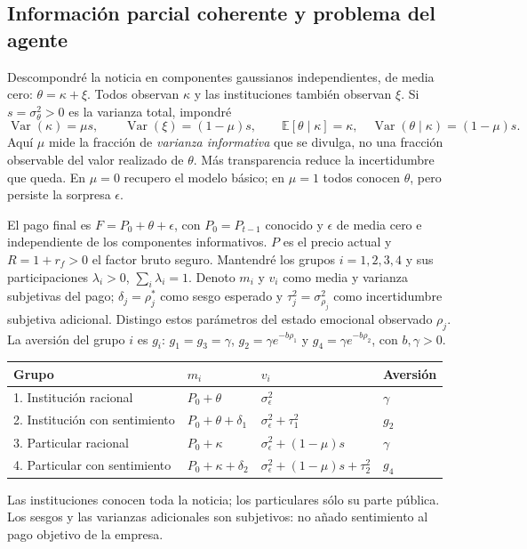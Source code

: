 \documentclass[11pt]{article}
\newcommand{\E}{\mathbb E}
\newcommand{\Var}{\operatorname{Var}}
\begin{document}
\newpage
\subsection*{Información parcial coherente y problema del agente}
Descompondré la noticia en componentes gaussianos independientes, de media
cero: $\theta=\kappa+\xi$. Todos observan $\kappa$ y las instituciones también
observan $\xi$. Si $s=\sigma_\theta^2>0$ es la varianza total, impondré
\begin{equation}\label{eq:information}
 \Var(\kappa)=\mu s,\qquad \Var(\xi)=(1-\mu)s,\qquad
 \E[\theta\mid\kappa]=\kappa,\quad
 \Var(\theta\mid\kappa)=(1-\mu)s.
\end{equation}
Aquí $\mu$ mide la fracción de \emph{varianza informativa} que se divulga,
no una fracción observable del valor realizado de $\theta$. Más transparencia
reduce la incertidumbre que queda. En $\mu=0$ recupero el modelo básico;
en $\mu=1$ todos conocen $\theta$, pero persiste la sorpresa $\epsilon$.

El pago final es $F=P_0+\theta+\epsilon$, con $P_0=P_{t-1}$ conocido y
$\epsilon$ de media cero e independiente de los componentes informativos.
$P$ es el precio actual y $R=1+r_f>0$ el factor bruto seguro. Mantendré
los grupos $i=1,2,3,4$ y sus participaciones $\lambda_i>0$,
$\sum_i\lambda_i=1$. Denoto $m_i$ y $v_i$ como media y varianza subjetivas
del pago; $\delta_j=\rho_j^*$ como sesgo esperado y
$\tau_j^2=\sigma_{\rho_j}^2$ como incertidumbre subjetiva adicional.
Distingo estos parámetros del estado emocional observado $\rho_j$.
La aversión del grupo $i$ es $g_i$: $g_1=g_3=\gamma$,
$g_2=\gamma e^{-b\rho_1}$ y $g_4=\gamma e^{-b\rho_2}$, con $b,\gamma>0$.

\begin{center}\small
\begin{tabular}{@{}llll@{}}
\toprule
Grupo & $m_i$ & $v_i$ & Aversión\\
\midrule
1. Institución racional & $P_0+\theta$ & $\sigma_\epsilon^2$ & $\gamma$\\
2. Institución con sentimiento & $P_0+\theta+\delta_1$ & $\sigma_\epsilon^2+\tau_1^2$ & $g_2$\\
3. Particular racional & $P_0+\kappa$ & $\sigma_\epsilon^2+(1-\mu)s$ & $\gamma$\\
4. Particular con sentimiento & $P_0+\kappa+\delta_2$ & $\sigma_\epsilon^2+(1-\mu)s+\tau_2^2$ & $g_4$\\
\bottomrule
\end{tabular}
\end{center}
Las instituciones conocen toda la noticia; los particulares sólo su parte
pública. Los sesgos y las varianzas adicionales son subjetivos: no añado
sentimiento al pago objetivo de la empresa.
\end{document}
